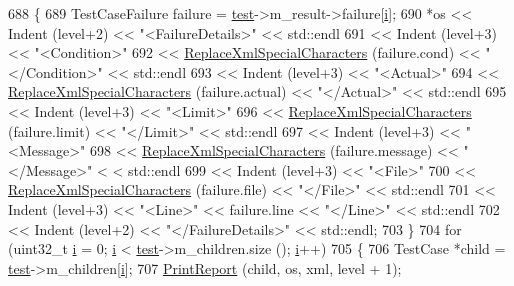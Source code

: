 \begin{DoxyCode}
688         \{
689           TestCaseFailure failure = \hyperlink{main-test-sync_8cc_a708a4c1a4d0c4acc4c447310dd4db27f}{test}->m\_result->failure[\hyperlink{bernuolliDistribution_8m_a6f6ccfcf58b31cb6412107d9d5281426}{i}];
690           *os << Indent (level+2) << \textcolor{stringliteral}{"<FailureDetails>"} << std::endl
691               << Indent (level+3) << \textcolor{stringliteral}{"<Condition>"} 
692               << \hyperlink{classns3_1_1TestRunnerImpl_a0fb43cfe6d466a412f52d57dd391bbcd}{ReplaceXmlSpecialCharacters} (failure.cond) << \textcolor{stringliteral}{"</Condition>"} <<
       std::endl
693               << Indent (level+3) << \textcolor{stringliteral}{"<Actual>"} 
694               << \hyperlink{classns3_1_1TestRunnerImpl_a0fb43cfe6d466a412f52d57dd391bbcd}{ReplaceXmlSpecialCharacters} (failure.actual) << \textcolor{stringliteral}{"</Actual>"} << 
      std::endl
695               << Indent (level+3) << \textcolor{stringliteral}{"<Limit>"} 
696               << \hyperlink{classns3_1_1TestRunnerImpl_a0fb43cfe6d466a412f52d57dd391bbcd}{ReplaceXmlSpecialCharacters} (failure.limit) << \textcolor{stringliteral}{"</Limit>"} << 
      std::endl
697               << Indent (level+3) << \textcolor{stringliteral}{"<Message>"} 
698               << \hyperlink{classns3_1_1TestRunnerImpl_a0fb43cfe6d466a412f52d57dd391bbcd}{ReplaceXmlSpecialCharacters} (failure.message) << \textcolor{stringliteral}{"</Message>"} <
      < std::endl
699               << Indent (level+3) << \textcolor{stringliteral}{"<File>"} 
700               << \hyperlink{classns3_1_1TestRunnerImpl_a0fb43cfe6d466a412f52d57dd391bbcd}{ReplaceXmlSpecialCharacters} (failure.file) << \textcolor{stringliteral}{"</File>"} << 
      std::endl
701               << Indent (level+3) << \textcolor{stringliteral}{"<Line>"} << failure.line << \textcolor{stringliteral}{"</Line>"} << std::endl
702               << Indent (level+2) << \textcolor{stringliteral}{"</FailureDetails>"} << std::endl;
703         \}
704       \textcolor{keywordflow}{for} (uint32\_t \hyperlink{bernuolliDistribution_8m_a6f6ccfcf58b31cb6412107d9d5281426}{i} = 0; \hyperlink{bernuolliDistribution_8m_a6f6ccfcf58b31cb6412107d9d5281426}{i} < \hyperlink{main-test-sync_8cc_a708a4c1a4d0c4acc4c447310dd4db27f}{test}->m\_children.size (); \hyperlink{bernuolliDistribution_8m_a6f6ccfcf58b31cb6412107d9d5281426}{i}++)
705         \{
706           TestCase *child = \hyperlink{main-test-sync_8cc_a708a4c1a4d0c4acc4c447310dd4db27f}{test}->m\_children[\hyperlink{bernuolliDistribution_8m_a6f6ccfcf58b31cb6412107d9d5281426}{i}];
707           \hyperlink{classns3_1_1TestRunnerImpl_a959b05cdd96f86f4be4490f16186f7c5}{PrintReport} (child, os, xml, level + 1);

\end{DoxyCode}
